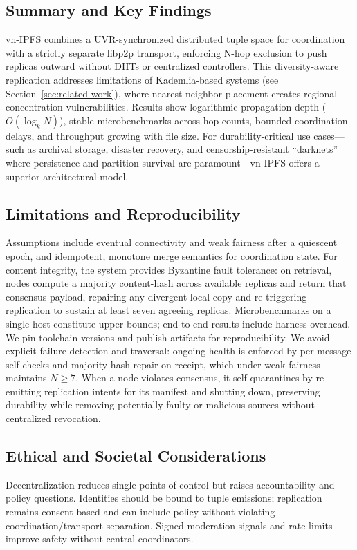 \documentclass[runningheads]{llncs}
\begin{document}
\subsection{Summary and Key Findings}
vn-IPFS combines a UVR-synchronized distributed tuple space for coordination with a strictly separate libp2p transport, enforcing N-hop exclusion to push replicas outward without DHTs or centralized controllers. This diversity-aware replication addresses limitations of Kademlia-based systems (see Section~\ref{sec:related-work}), where nearest-neighbor placement creates regional concentration vulnerabilities. Results show logarithmic propagation depth ($O(\log_k N)$), stable microbenchmarks across hop counts, bounded coordination delays, and throughput growing with file size. For durability-critical use cases—such as archival storage, disaster recovery, and censorship-resistant ``darknets'' where persistence and partition survival are paramount—vn-IPFS offers a superior architectural model.

\subsection{Limitations and Reproducibility}
Assumptions include eventual connectivity and weak fairness after a quiescent epoch, and idempotent, monotone merge semantics for coordination state. For content integrity, the system provides Byzantine fault tolerance: on retrieval, nodes compute a majority content-hash across available replicas and return that consensus payload, repairing any divergent local copy and re-triggering replication to sustain at least seven agreeing replicas. Microbenchmarks on a single host constitute upper bounds; end-to-end results include harness overhead. We pin toolchain versions and publish artifacts for reproducibility. We avoid explicit failure detection and traversal: ongoing health is enforced by per-message self-checks and majority-hash repair on receipt, which under weak fairness maintains \(N\ge 7\). When a node violates consensus, it self-quarantines by re-emitting replication intents for its manifest and shutting down, preserving durability while removing potentially faulty or malicious sources without centralized revocation.

\subsection{Ethical and Societal Considerations}
Decentralization reduces single points of control but raises accountability and policy questions. Identities should be bound to tuple emissions; replication remains consent-based and can include policy without violating coordination/transport separation. Signed moderation signals and rate limits improve safety without central coordinators.
\end{document}
